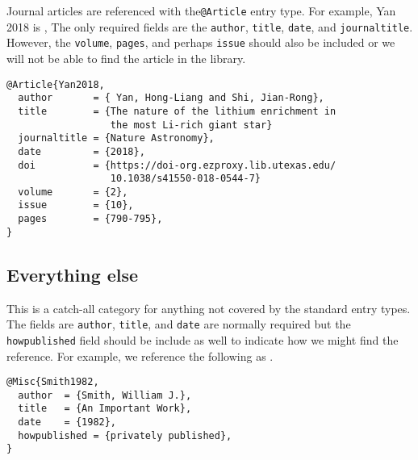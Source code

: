 Journal articles are referenced with the\texttt{@Article} entry type.
For example, Yan 2018 is \cite{Yan2018}, The only required fields are
the \texttt{author}, \texttt{title}, \texttt{date}, and
\texttt{journaltitle}.  However, the \texttt{volume},
\texttt{pages}, and perhaps \texttt{issue} should also be included or
we will not be able to find the article in the library.

\begin{verbatim}
@Article{Yan2018,
  author       = { Yan, Hong-Liang and Shi, Jian-Rong},
  title        = {The nature of the lithium enrichment in
                  the most Li-rich giant star}
  journaltitle = {Nature Astronomy},
  date         = {2018},
  doi          = {https://doi-org.ezproxy.lib.utexas.edu/
                  10.1038/s41550-018-0544-7}
  volume       = {2},
  issue        = {10},
  pages        = {790-795},
}

\end{verbatim}

\subsection{Everything else}
This is a catch-all category for anything not covered by the standard
entry types.  The fields are \texttt{author}, \texttt{title}, and
\texttt{date} are normally required but the \texttt{howpublished}
field should be include as well to indicate how we might find the
reference. For example, we reference the following as
\cite{Smith1982}.

\begin{verbatim}
@Misc{Smith1982,
  author  = {Smith, William J.},
  title   = {An Important Work},
  date    = {1982},
  howpublished = {privately published},
}
\end{verbatim}
